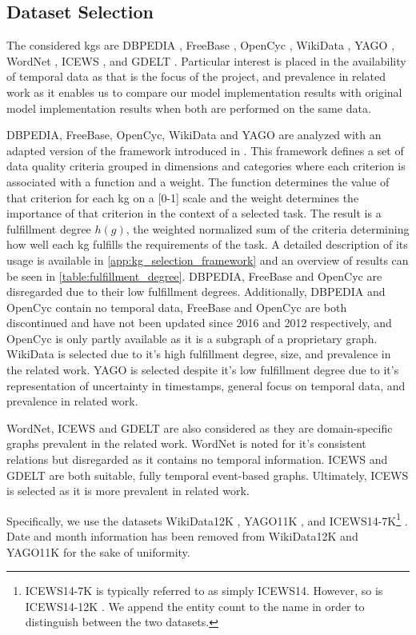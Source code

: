 \subsection{Dataset Selection}
\label{subsec:selection_of_kgs}

The considered \glspl{kg} are DBPEDIA \cite{lehmann2014dbpedia}, FreeBase \cite{bollacker2008freebase}, OpenCyc \cite{2012opencyc, lenat1995cyc}, WikiData \cite{vrandecic2014wikidata}, YAGO \cite{mahdisoltani2015YAGO3, tahon2020YAGO4}, WordNet \cite{miller1995wordnet}, ICEWS \cite{boschee2015ICEWS}, and GDELT \cite{Leetaru2013gdelt, 2023gdelt}.
Particular interest is placed in the availability of temporal data as that is the focus of the project, and prevalence in related work as it enables us to compare our model implementation results with original model implementation results when both are performed on the same data.

DBPEDIA, FreeBase, OpenCyc, WikiData and YAGO are analyzed with an adapted version of the framework introduced in \cite{farber2017dataquality}.
This framework defines a set of data quality criteria grouped in dimensions and categories where each criterion is associated with a function and a weight.
The function determines the value of that criterion for each \gls{kg} on a [0-1] scale and the weight determines the importance of that criterion in the context of a selected task.
The result is a fulfillment degree $h(g)$, the weighted normalized sum of the criteria determining how well each \gls{kg} fulfills the requirements of the task.
A detailed description of its usage is available in \autoref{app:kg_selection_framework} and an overview of results can be seen in \autoref{table:fulfillment_degree}.
DBPEDIA, FreeBase and OpenCyc are disregarded due to their low fulfillment degrees. Additionally, DBPEDIA and OpenCyc contain no temporal data, FreeBase and OpenCyc are both discontinued and have not been updated since 2016 and 2012 respectively, and OpenCyc is only partly available as it is a subgraph of a proprietary graph.
WikiData is selected due to it's high fulfillment degree, size, and prevalence in the related work.
YAGO is selected despite it's low fulfillment degree due to it's representation of uncertainty in timestamps, general focus on temporal data, and prevalence in related work.

WordNet, ICEWS and GDELT are also considered as they are domain-specific graphs prevalent in the related work.
WordNet is noted for it's consistent relations but disregarded as it contains no temporal information.
ICEWS and GDELT are both suitable, fully temporal event-based graphs. Ultimately, ICEWS is selected as it is more prevalent in related work.

Specifically, we use the datasets WikiData12K \cite{dasgupta2018hyte}, YAGO11K \cite{dasgupta2018hyte}, and ICEWS14-7K\footnote{ICEWS14-7K is typically referred to as simply ICEWS14. However, so is ICEWS14-12K \cite{trivedi2017knowevolve}. We append the entity count to the name in order to distinguish between the two datasets.} \cite{garcia-duran2018ta}. Date and month information has been removed from WikiData12K and YAGO11K for the sake of uniformity.